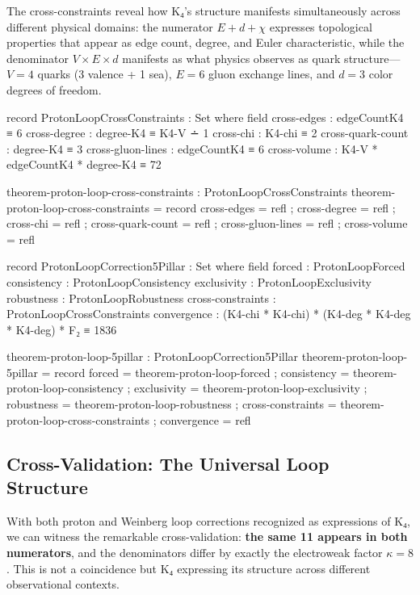 \documentclass[11pt,a4paper]{book}
\begin{document}
The cross-constraints reveal how K₄'s structure manifests simultaneously across different physical domains: the numerator $E + d + \chi$ expresses topological properties that appear as edge count, degree, and Euler characteristic, while the denominator $V \times E \times d$ manifests as what physics observes as quark structure—$V = 4$ quarks (3 valence + 1 sea), $E = 6$ gluon exchange lines, and $d = 3$ color degrees of freedom.

\begin{code}
record ProtonLoopCrossConstraints : Set where
  field
    cross-edges : edgeCountK4 ≡ 6
    cross-degree : degree-K4 ≡ K4-V ∸ 1
    cross-chi : K4-chi ≡ 2
    cross-quark-count : degree-K4 ≡ 3
    cross-gluon-lines : edgeCountK4 ≡ 6
    cross-volume : K4-V * edgeCountK4 * degree-K4 ≡ 72

theorem-proton-loop-cross-constraints : ProtonLoopCrossConstraints
theorem-proton-loop-cross-constraints = record
  { cross-edges = refl
  ; cross-degree = refl
  ; cross-chi = refl
  ; cross-quark-count = refl
  ; cross-gluon-lines = refl
  ; cross-volume = refl
  }

record ProtonLoopCorrection5Pillar : Set where
  field
    forced : ProtonLoopForced
    consistency : ProtonLoopConsistency
    exclusivity : ProtonLoopExclusivity
    robustness : ProtonLoopRobustness
    cross-constraints : ProtonLoopCrossConstraints
    convergence : (K4-chi * K4-chi) * (K4-deg * K4-deg * K4-deg) * F₂ ≡ 1836

theorem-proton-loop-5pillar : ProtonLoopCorrection5Pillar
theorem-proton-loop-5pillar = record
  { forced = theorem-proton-loop-forced
  ; consistency = theorem-proton-loop-consistency
  ; exclusivity = theorem-proton-loop-exclusivity
  ; robustness = theorem-proton-loop-robustness
  ; cross-constraints = theorem-proton-loop-cross-constraints
  ; convergence = refl
  }
\end{code}

\subsection{Cross-Validation: The Universal Loop Structure}

With both proton and Weinberg loop corrections recognized as expressions of K₄, we can witness the remarkable cross-validation: \textbf{the same 11 appears in both numerators}, and the denominators differ by exactly the electroweak factor $\kappa = 8$. This is not a coincidence but K₄ expressing its structure across different observational contexts.
\end{document}
